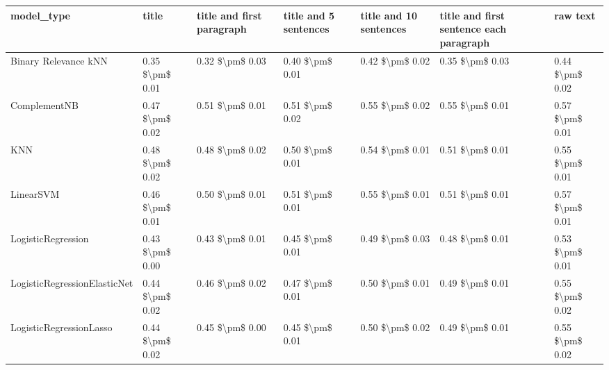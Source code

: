 \begin{tabular}{lllllll}
\toprule
                     model\_type &           title & title and first paragraph & title and 5 sentences & title and 10 sentences & title and first sentence each paragraph &            raw text \\
\midrule
           Binary Relevance kNN & 0.35 \$\textbackslash pm\$ 0.01 &           0.32 \$\textbackslash pm\$ 0.03 &       0.40 \$\textbackslash pm\$ 0.01 &        0.42 \$\textbackslash pm\$ 0.02 &                         0.35 \$\textbackslash pm\$ 0.03 &     0.44 \$\textbackslash pm\$ 0.02 \\
                   ComplementNB & 0.47 \$\textbackslash pm\$ 0.02 &           0.51 \$\textbackslash pm\$ 0.01 &       0.51 \$\textbackslash pm\$ 0.02 &        0.55 \$\textbackslash pm\$ 0.02 &                         0.55 \$\textbackslash pm\$ 0.01 &     0.57 \$\textbackslash pm\$ 0.01 \\
                            KNN & 0.48 \$\textbackslash pm\$ 0.02 &           0.48 \$\textbackslash pm\$ 0.02 &       0.50 \$\textbackslash pm\$ 0.01 &        0.54 \$\textbackslash pm\$ 0.01 &                         0.51 \$\textbackslash pm\$ 0.01 &     0.55 \$\textbackslash pm\$ 0.01 \\
                      LinearSVM & 0.46 \$\textbackslash pm\$ 0.01 &           0.50 \$\textbackslash pm\$ 0.01 &       0.51 \$\textbackslash pm\$ 0.01 &        0.55 \$\textbackslash pm\$ 0.01 &                         0.51 \$\textbackslash pm\$ 0.01 &     0.57 \$\textbackslash pm\$ 0.01 \\
             LogisticRegression & 0.43 \$\textbackslash pm\$ 0.00 &           0.43 \$\textbackslash pm\$ 0.01 &       0.45 \$\textbackslash pm\$ 0.01 &        0.49 \$\textbackslash pm\$ 0.03 &                         0.48 \$\textbackslash pm\$ 0.01 &     0.53 \$\textbackslash pm\$ 0.01 \\
   LogisticRegressionElasticNet & 0.44 \$\textbackslash pm\$ 0.02 &           0.46 \$\textbackslash pm\$ 0.02 &       0.47 \$\textbackslash pm\$ 0.01 &        0.50 \$\textbackslash pm\$ 0.01 &                         0.49 \$\textbackslash pm\$ 0.01 &     0.55 \$\textbackslash pm\$ 0.02 \\
        LogisticRegressionLasso & 0.44 \$\textbackslash pm\$ 0.02 &           0.45 \$\textbackslash pm\$ 0.00 &       0.45 \$\textbackslash pm\$ 0.01 &        0.50 \$\textbackslash pm\$ 0.02 &                         0.49 \$\textbackslash pm\$ 0.01 &     0.55 \$\textbackslash pm\$ 0.02 \\

\end{tabular}
